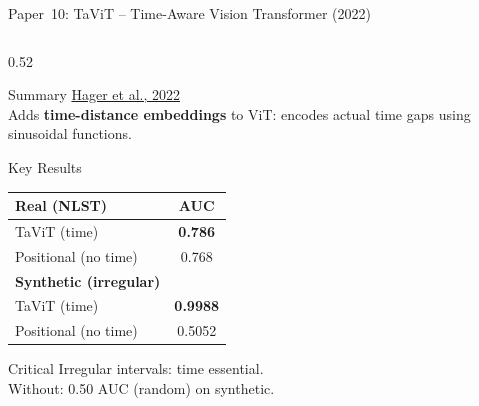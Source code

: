 \documentclass[aspectratio=169,xcolor=dvipsnames]{beamer}
\begin{document}
\begin{frame}{Paper~10: TaViT -- Time-Aware Vision Transformer (2022)}
    \begin{columns}
        \begin{column}{0.52\textwidth}
            \begin{block}{Summary}
                \scriptsize
                \href{https://arxiv.org/abs/2207.01032}{Hager et al., 2022}\\[0.1em]
                Adds \textbf{time-distance embeddings} to ViT: encodes actual time gaps using sinusoidal functions.
            \end{block}

            \vspace{0.1em}

            \begin{block}{Key Results}
                \scriptsize
                \begin{tabular}{lc}
                    \toprule
                    \textbf{Real (NLST)} & \textbf{AUC} \\
                    \midrule
                    TaViT (time) & \textbf{0.786} \\
                    Positional (no time) & 0.768 \\
                    \midrule
                    \textbf{Synthetic (irregular)} & \\
                    \midrule
                    TaViT (time) & \textbf{0.9988} \\
                    Positional (no time) & 0.5052 \\
                    \bottomrule
                \end{tabular}
            \end{block}

            \vspace{0.1em}

            \begin{alertblock}{\small Critical}
                \scriptsize
                Irregular intervals: time essential.\\
                Without: 0.50 AUC (random) on synthetic.
            \end{alertblock}
        \end{column}


\end{columns}
\end{frame}
\end{document}
